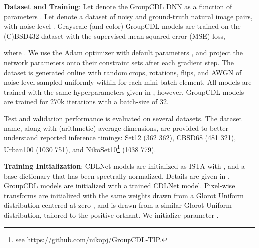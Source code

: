 \documentclass[lettersize,journal]{IEEEtran}
\begin{document}
\begin{table}[tb]
\caption{Architectures of the GroupCDL models, CDLNet models, and variants presented in the experimental section. 
We use  and  for color and grayscale denoising networks, respectively.
A filter size of  is used for all models. Conv-stride
, adjacency update period , is used unless otherwise specified.}
\centering
{}
\label{tab:arch}
\end{table}

\textbf{Dataset and Training}:
Let  denote the GroupCDL DNN as a function of
parameters . Let  denote a dataset of noisy and
ground-truth natural image pairs, with noise-level . Grayscale (and color) GroupCDL models are trained on
the (C)BSD432 \cite{bsd} dataset with the supervised mean squared
error (MSE) loss,

where . We use the Adam
optimizer with default parameters \cite{adam}, and project the network parameters
onto their constraint sets after each gradient step.
The dataset is generated online with random crops, rotations, flips, and
AWGN of noise-level  sampled uniformly within  for each mini-batch element. All models are trained with the same hyperparameters given in
\cite{janjusevicCDLNet2022}, however, GroupCDL models are trained for 270k
iterations with a batch-size of 32.

Test and validation performance is evaluated on several datasets. The dataset name, along with (arithmetic) average 
dimensions, are provided to better understand reported inference timings: Set12 (362  362), CBSD68 \cite{bsd} (481  321), Urban100 \cite{Urban100} (1030  751), and 
NikoSet10\footnote{see \href{https://github.com/nikopj/GroupCDL-TIP}{https://github.com/nikopj/GroupCDL-TIP}.} (1038  779).

\textbf{Training Initialization}:
CDLNet models are initialized as ISTA with , and
a base dictionary  that has been spectrally normalized. Details are given
in \cite{janjusevicCDLNet2022}. GroupCDL models are initialized with a trained
CDLNet model. Pixel-wise transforms  are initialized with the same weights drawn from a Glorot Uniform distribution centered at zero \cite{glorot}, and  is drawn from a similar Glorot Uniform distribution, tailored to the positive orthant. We initialize parameter .
\end{document}
